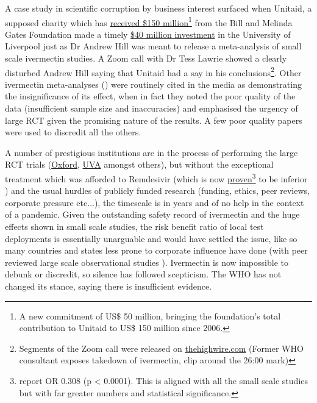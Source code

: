 \documentclass[11pt,a4paper,notitlepage]{report}
\begin{document}
A case study in scientific corruption by business interest surfaced when Unitaid, a supposed charity which has \href{https://unitaid.org/news-blog/unitaid-hails-new-us-50-million-contribution-bill-melinda-gates-foundation}{received \$150 million}\footnote{A new commitment of US\$ 50 million, bringing the foundation’s total contribution to Unitaid to US\$ 150 million since 2006.} from the Bill and Melinda Gates Foundation \cite{unitaid122017} made a timely \href{https://unitaid.org/news-blog/unitaid-funding-sees-launch-of-worlds-first-long-acting-medicines-centre-at-university-of-liverpool}{\$40 million investment} in the University of Liverpool \cite{unitaid012021} just as Dr Andrew Hill was meant to release a meta-analysis of small scale ivermectin studies. A Zoom call with Dr Tess Lawrie showed a clearly disturbed Andrew Hill saying that Unitaid had a say in his conclusions\footnote{Segments of the Zoom call were released on \href{https://thehighwire.com/videos/former-w-h-o-consultant-exposes-takedown-of-ivermectin/}{thehighwire.com} (Former WHO consultant exposes takedown of ivermectin, clip around the 26:00 mark)}. Other ivermectin meta-analyses (\cite{Popp21}) were routinely cited in the media as demonstrating the insignificance of its effect, when in fact they noted the poor quality of the data (insufficient sample size and inaccuracies) and emphasised the urgency of large RCT given the promising nature of the results. A few poor quality papers were used to discredit all the others. 

A number of prestigious institutions are in the process of performing the large RCT trials (\href{https://www.principletrial.org/news/ivermectin-to-be-investigated-as-a-possible-treatment-for-covid-19-in-oxford2019s-principle-trial}{Oxford}, \href{https://news.virginia.edu/content/uva-health-joins-national-trial-testing-medications-mild-moderate-covid-19}{UVA} amongst others), but without the exceptional treatment which was afforded to Remdesivir (which is now \href{https://www.sciencedirect.com/science/article/pii/S1201971221009887}{proven}\footnote{\citet{EFIMENKO2022S40} report OR 0.308 (p < 0.0001). This is aligned with all the small scale studies but with far greater numbers and statistical significance.} to be inferior \cite{EFIMENKO2022S40}) and the usual hurdles of publicly funded research (funding, ethics, peer reviews, corporate pressure etc...), the timescale is in years and of no help in the context of a pandemic. Given the outstanding safety record of ivermectin and the huge effects shown in small scale studies, the risk benefit ratio of local test deployments is essentially unarguable and would have settled the issue, like so many countries and states less prone to corporate influence have done (with peer reviewed large scale observational studies \cite{Kerr2022-ps}). Ivermectin is now impossible to debunk or discredit, so silence has followed scepticism. The WHO has not changed its stance, saying there is insufficient evidence.
\end{document}
